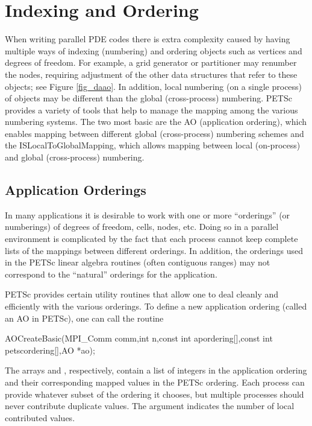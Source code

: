\section{Indexing and Ordering}
\label{sec_indexingandordering}

  When writing parallel PDE codes there is extra complexity caused by
having multiple ways of indexing (numbering) and ordering objects such
as vertices and degrees of freedom. For example, a grid generator
or partitioner may renumber the nodes, requiring adjustment of the
other data structures that refer to these objects; see Figure
\ref{fig_daao}.  In addition, local numbering (on a single process) 
of objects may be different than the global (cross-process)
numbering. PETSc provides a variety of tools that help to manage the
mapping among the various numbering systems. The two most basic are
the AO (application ordering), which enables mapping between
different global (cross-process) numbering schemes and the ISLocalToGlobalMapping, which allows mapping between local 
(on-process) and global (cross-process) numbering.

\subsection{Application Orderings}
\label{sec_ao}

In many applications it is desirable to work with one or more
``orderings'' (or numberings) of degrees of freedom, cells, nodes,
etc.   Doing so in a parallel environment is
complicated by the fact that each process cannot keep complete lists
of the mappings between different orderings. In addition, the
orderings used in the PETSc linear algebra routines (often contiguous 
ranges) may not correspond to the ``natural'' orderings for the application.

PETSc provides certain utility routines that allow one to deal cleanly
and efficiently with the various orderings. To define a new application ordering
(called an AO in PETSc), one can call the routine 
\begin{tabbing}
  AOCreateBasic(MPI\_Comm comm,int n,const int apordering[],const int petscordering[],AO *ao);
\end{tabbing}
The 
arrays  and , respectively, contain a list of integers
in the application ordering and their corresponding mapped values in the PETSc 
ordering. Each process can provide whatever subset of the ordering it 
chooses, but multiple processes should never contribute duplicate values. 
The argument  indicates the number of local contributed values.

